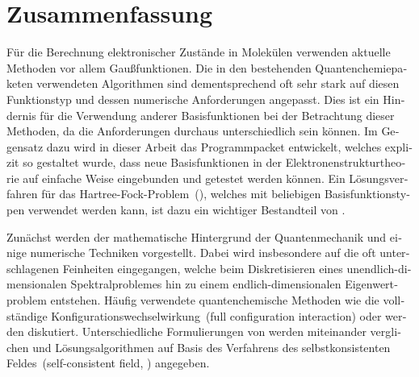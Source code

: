%
%
\chapter*{Zusammenfassung}
{}

\begin{otherlanguage}{ngerman}
Für die Berechnung elektronischer Zustände in Molekülen
verwenden aktuelle Methoden vor allem Gaußfunktionen.
Die in den bestehenden Quantenchemiepaketen verwendeten Algorithmen
sind dementsprechend oft sehr stark
auf diesen Funktionstyp und dessen numerische Anforderungen angepasst.
Dies ist ein Hindernis für die Verwendung
anderer Basisfunktionen bei der Betrachtung dieser Methoden,
da die Anforderungen durchaus unterschiedlich sein können.
Im Gegensatz dazu wird in dieser Arbeit
das Programmpacket \molsturm entwickelt,
welches explizit so gestaltet wurde,
dass neue Basisfunktionen in der Elektronenstrukturtheorie
auf einfache Weise eingebunden und getestet werden können.
Ein Lösungsverfahren für das Hartree-Fock-Problem~(\HF),
welches mit beliebigen Basisfunktionstypen verwendet werden kann,
ist dazu ein wichtiger Bestandteil von \molsturm.

Zunächst werden der mathematische Hintergrund der Quantenmechanik
und einige numerische Techniken vorgestellt.
Dabei wird insbesondere auf die oft unterschlagenen Feinheiten eingegangen,
welche beim Diskretisieren eines unendlich-dimensionalen Spektralproblemes
hin zu einem endlich-dimensionalen Eigenwertproblem entstehen.
Häufig verwendete quantenchemische Methoden
wie die vollständige Konfigurationswechselwirkung~(full configuration interaction)
oder \HF werden diskutiert.
Unterschiedliche Formulierungen von \HF werden miteinander verglichen
und
Lösungsalgorithmen auf Basis des Verfahrens des
selbstkonsistenten Feldes~(self-consistent field, \SCF) angegeben.


\end{otherlanguage}
